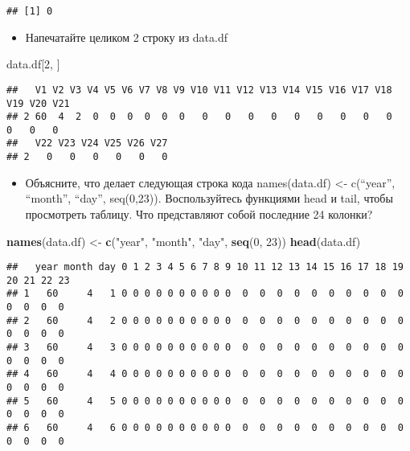 \documentclass[
]{article}
\newenvironment{Shaded}{\begin{snugshade}}{\end{snugshade}}
\newcommand{\DecValTok}[1]{\textcolor[rgb]{0.00,0.00,0.81}{#1}}
\newcommand{\FunctionTok}[1]{\textcolor[rgb]{0.13,0.29,0.53}{\textbf{#1}}}
\newcommand{\NormalTok}[1]{#1}
\newcommand{\OtherTok}[1]{\textcolor[rgb]{0.56,0.35,0.01}{#1}}
\newcommand{\StringTok}[1]{\textcolor[rgb]{0.31,0.60,0.02}{#1}}
\providecommand{\tightlist}{%
  \setlength{\itemsep}{0pt}\setlength{\parskip}{0pt}}
\begin{document}
\begin{verbatim}
## [1] 0
\end{verbatim}

\begin{itemize}
\tightlist
\item
  Напечатайте целиком 2 строку из data.df
\end{itemize}

\begin{Shaded}
\begin{Highlighting}[]
\NormalTok{data.df[}\DecValTok{2}\NormalTok{, ]}
\end{Highlighting}
\end{Shaded}

\begin{verbatim}
##   V1 V2 V3 V4 V5 V6 V7 V8 V9 V10 V11 V12 V13 V14 V15 V16 V17 V18 V19 V20 V21
## 2 60  4  2  0  0  0  0  0  0   0   0   0   0   0   0   0   0   0   0   0   0
##   V22 V23 V24 V25 V26 V27
## 2   0   0   0   0   0   0
\end{verbatim}

\begin{itemize}
\tightlist
\item
  Объясните, что делает следующая строка кода names(data.df) \textless-
  c(``year'', ``month'', ``day'', seq(0,23)). Воспользуйтесь функциями
  head и tail, чтобы просмотреть таблицу. Что представляют собой
  последние 24 колонки?
\end{itemize}

\begin{Shaded}
\begin{Highlighting}[]
\FunctionTok{names}\NormalTok{(data.df) }\OtherTok{\textless{}{-}} \FunctionTok{c}\NormalTok{(}\StringTok{"year"}\NormalTok{, }\StringTok{"month"}\NormalTok{, }\StringTok{"day"}\NormalTok{, }\FunctionTok{seq}\NormalTok{(}\DecValTok{0}\NormalTok{, }\DecValTok{23}\NormalTok{))}
\FunctionTok{head}\NormalTok{(data.df)}
\end{Highlighting}
\end{Shaded}

\begin{verbatim}
##   year month day 0 1 2 3 4 5 6 7 8 9 10 11 12 13 14 15 16 17 18 19 20 21 22 23
## 1   60     4   1 0 0 0 0 0 0 0 0 0 0  0  0  0  0  0  0  0  0  0  0  0  0  0  0
## 2   60     4   2 0 0 0 0 0 0 0 0 0 0  0  0  0  0  0  0  0  0  0  0  0  0  0  0
## 3   60     4   3 0 0 0 0 0 0 0 0 0 0  0  0  0  0  0  0  0  0  0  0  0  0  0  0
## 4   60     4   4 0 0 0 0 0 0 0 0 0 0  0  0  0  0  0  0  0  0  0  0  0  0  0  0
## 5   60     4   5 0 0 0 0 0 0 0 0 0 0  0  0  0  0  0  0  0  0  0  0  0  0  0  0
## 6   60     4   6 0 0 0 0 0 0 0 0 0 0  0  0  0  0  0  0  0  0  0  0  0  0  0  0
\end{verbatim}
\end{document}
